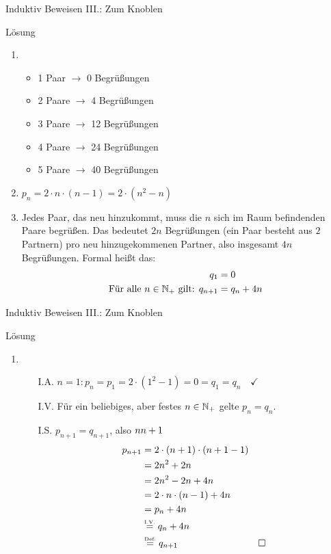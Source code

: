 \begin{frame}{Induktiv Beweisen III.: Zum Knoblen}
	\begin{block}{Lösung}
		\begin{enumerate}
			\item \begin{itemize}
				\item 1 Paar $\rightarrow$ 0 Begrüßungen
				\item 2 Paare $\rightarrow$ 4 Begrüßungen
				\item 3 Paare $\rightarrow$ 12 Begrüßungen
				\item 4 Paare $\rightarrow$ 24 Begrüßungen
				\item 5 Paare $\rightarrow$ 40 Begrüßungen
			\end{itemize} \pause
			\item $p_n = 2 \cdot n \cdot (n-1) = 2 \cdot (n^2 -n)$ \pause
			\item Jedes Paar, das neu hinzukommt, muss die $n$ sich im Raum befindenden Paare begrüßen. Das bedeutet $2n$ Begrüßungen (ein Paar besteht aus $2$ Partnern) pro neu hinzugekommenen Partner, also insgesamt $4n$ Begrüßungen. Formal heißt das: 
			\begin{align*}
				q_1 &= 0 \\
				\text{Für alle } n \in \mathbb{N}_+ \text{ gilt: } q_{n+1} &= q_n + 4n
			\end{align*}
			\setcounter{kevin}{\value{enumi}}
		\end{enumerate}
	\end{block}
\end{frame}

\begin{frame}{Induktiv Beweisen III.: Zum Knoblen}
	\begin{block}{Lösung}
	\begin{enumerate}
		\setcounter{enumi}{\value{kevin}}
		\item \begin{itemize}
			\item[I.A.] $n=1: p_n = p_1 = 2 \cdot (1^2 -1 ) = 0 = q_1 = q_n \quad \checkmark$
			\item[I.V.] Für ein beliebiges, aber festes $n \in \mathbb{N}_+$ gelte $p_n=q_n$.
			\item[I.S.] \zz $p_{n+1}=q_{n+1}$, also $n \notStephan{\leadsto} \Stephan{\curvearrowright} n+1$
			\begin{align*}
				p_{n+1} &= 2 \cdot (n+1) \cdot (n+1-1) \\
						&= 2n^2 + 2n \\
						&= 2n^2 -2n + 4n \\
						&= 2 \cdot n \cdot (n-1) + 4n \\
						&= p_n + 4n \\
						&\eqtext{I.V.} q_n + 4n \\
						&\eqtext{Def.} q_{n+1} & \qedwhite{}
			\end{align*}
		\end{itemize}
	\end{enumerate}		
	\end{block}
\end{frame}




